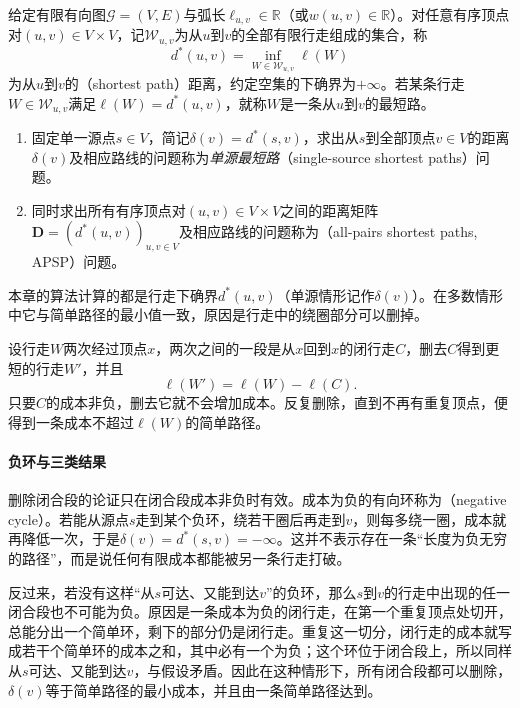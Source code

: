 \begin{definition}
\label{def:graph-opt-shortest-path}
给定有限有向图$\mathcal G=(V,E)$与弧长$\ell_{u,v}\in\mathbb R$（或$w(u,v)\in\mathbb R$）。对任意有序顶点对$(u,v)\in V\times V$，记$\mathcal W_{u,v}$为从$u$到$v$的全部有限行走组成的集合，称
\begin{equation}
  d^*(u,v)=\inf_{W\in\mathcal W_{u,v}}\ell(W)
  \label{eq:graph-opt-shortest-distance}
\end{equation}
为从$u$到$v$的（shortest path）距离，约定空集的下确界为$+\infty$。若某条行走$W\in\mathcal W_{u,v}$满足$\ell(W)=d^*(u,v)$，就称$W$是一条从$u$到$v$的最短路。
\begin{enumerate}
  \item 固定单一源点$s\in V$，简记$\delta(v)=d^*(s,v)$，求出从$s$到全部顶点$v\in V$的距离$\delta(v)$及相应路线的问题称为\emph{单源最短路}（single-source shortest paths）问题。
  \item 同时求出所有有序顶点对$(u,v)\in V\times V$之间的距离矩阵$\bm D=(d^*(u,v))_{u,v\in V}$及相应路线的问题称为（all-pairs shortest paths, APSP）问题。
\end{enumerate}
\end{definition}

本章的算法计算的都是行走下确界$d^*(u,v)$（单源情形记作$\delta(v)$）。在多数情形中它与简单路径的最小值一致，原因是行走中的绕圈部分可以删掉。

设行走$W$两次经过顶点$x$，两次之间的一段是从$x$回到$x$的闭行走$C$，删去$C$得到更短的行走$W'$，并且
\[
  \ell(W')=\ell(W)-\ell(C).
\]
只要$C$的成本非负，删去它就不会增加成本。反复删除，直到不再有重复顶点，便得到一条成本不超过$\ell(W)$的简单路径。

\paragraph{负环与三类结果}
删除闭合段的论证只在闭合段成本非负时有效。成本为负的有向环称为（negative cycle）。若能从源点$s$走到某个负环，绕若干圈后再走到$v$，则每多绕一圈，成本就再降低一次，于是$\delta(v)=d^*(s,v)=-\infty$。这并不表示存在一条“长度为负无穷的路径”，而是说任何有限成本都能被另一条行走打破。

反过来，若没有这样“从$s$可达、又能到达$v$”的负环，那么$s$到$v$的行走中出现的任一闭合段也不可能为负。原因是一条成本为负的闭行走，在第一个重复顶点处切开，总能分出一个简单环，剩下的部分仍是闭行走。重复这一切分，闭行走的成本就写成若干个简单环的成本之和，其中必有一个为负；这个环位于闭合段上，所以同样从$s$可达、又能到达$v$，与假设矛盾。因此在这种情形下，所有闭合段都可以删除，$\delta(v)$等于简单路径的最小成本，并且由一条简单路径达到。

